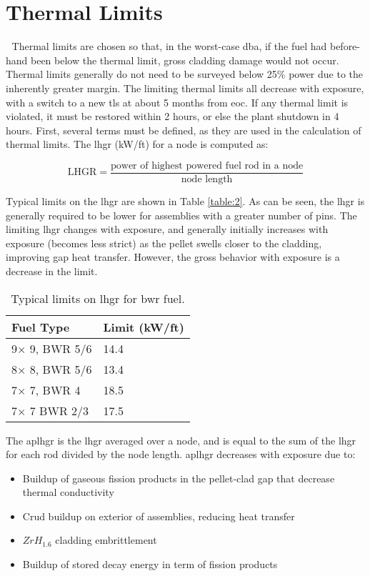 \documentclass[10pt]{article}
\begin{document}
\section{Thermal Limits}
Thermal limits are chosen so that, in the worst-case \gls{dba}, if the fuel had before-hand been below the thermal limit, gross cladding damage would not occur. Thermal limits generally do not need to be surveyed below 25\% power due to the inherently greater margin. The limiting thermal limits all decrease with exposure, with a switch to a new \gls{tls} at about 5 months from \gls{eoc}. If any thermal limit is violated, it must be restored within 2 hours, or else the plant shutdown in 4 hours. First, several terms must be defined, as they are used in the calculation of thermal limits. The \gls{lhgr} (kW/ft) for a node is computed as:

\begin{equation}
\textrm{LHGR}=\frac{\textrm{power of highest powered fuel rod in a node}}{\textrm{node length}}
\end{equation}

Typical limits on the \gls{lhgr} are shown in Table \ref{table:2}. As can be seen, the \gls{lhgr} is generally required to be lower for assemblies with a greater number of pins. The limiting \gls{lhgr} changes with exposure, and generally initially increases with exposure (becomes less strict) as the pellet swells closer to the cladding, improving gap heat transfer. However, the gross behavior with exposure is a decrease in the limit. 

\begin{table}[h]
\caption{Typical limits on \gls{lhgr} for \gls{bwr} fuel.}
\centering
\begin{tabular}{l l}
\hline\hline
Fuel Type & Limit (kW/ft)\\ [0.5ex]
\hline
9\(\times\) 9, BWR 5/6 & 14.4\\
8\(\times\) 8, BWR 5/6 & 13.4\\
7\(\times\) 7, BWR 4 & 18.5\\
7\(\times\) 7 BWR 2/3 & 17.5\\
\hline
\end{tabular}
\label{table:1}
\end{table}

The \gls{aplhgr} is the \gls{lhgr} averaged over a node, and is equal to the sum of the \gls{lhgr} for each rod divided by the node length. \gls{aplhgr} decreases with exposure due to: 

\begin{itemize}
\item Buildup of gaseous fission products in the pellet-clad gap that decrease thermal conductivity
\item Crud buildup on exterior of assemblies, reducing heat transfer
\item \(ZrH_{1.6}\) cladding embrittlement
\item Buildup of stored decay energy in term of fission products
\end{itemize}
\end{document}
